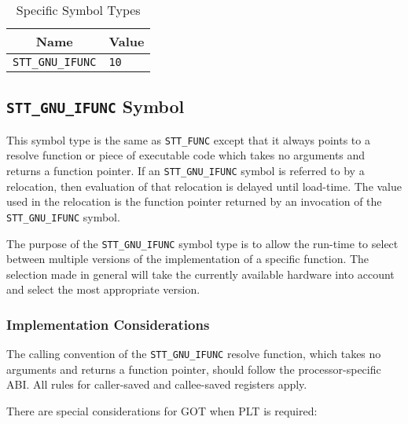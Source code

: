 \begin{table}[H]
\Hrule
  \caption{\xOS Specific Symbol Types}
  \label{ifunc}
  \begin{center}
    \begin{tabular}[t]{l|l}
      \multicolumn{1}{c}{Name} & \multicolumn{1}{c}{Value} \\
      \hline
      \texttt{STT_GNU_IFUNC} & \texttt{10}
    \end{tabular}
  \end{center}
\Hrule
\end{table}

\subsection{\texttt{STT_GNU_IFUNC} Symbol}

This symbol type is the same as \texttt{STT_FUNC} except that it always
points to a resolve function or piece of executable code which takes
no arguments and returns a function pointer.  If an \texttt{STT_GNU_IFUNC}
symbol is referred to by a relocation, then evaluation of that relocation
is delayed until load-time.  The value used in the relocation is the
function pointer returned by an invocation of the \texttt{STT_GNU_IFUNC}
symbol.

The purpose of the \texttt{STT_GNU_IFUNC} symbol type is to allow the
run-time to select between multiple versions of the implementation of
a specific function.  The selection made in general will take the
currently available hardware into account and select the most
appropriate version.

\subsubsection{Implementation Considerations}

The calling convention of the \texttt{STT_GNU_IFUNC} resolve
function, which takes no arguments and returns a function pointer,
should follow the processor-specific ABI. All rules for caller-saved
and callee-saved registers apply.

There are special considerations for GOT when PLT is required:

